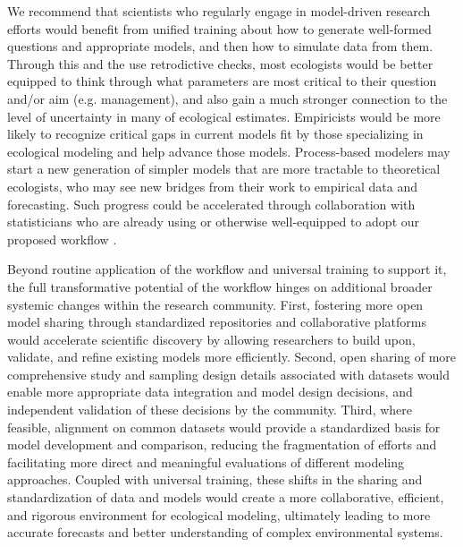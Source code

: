\documentclass[11pt]{article}
\newcommand{\llabel}[1]{\hypertarget{lintarget:#1}{}\linelabel{lin:#1}}
\begin{document}
We recommend that scientists who regularly engage in model-driven research efforts would benefit from unified training about how to generate well-formed questions and appropriate models, and then how to simulate data from them. Through this and the use retrodictive checks, most ecologists would be better equipped to think through what parameters are most critical to their question and/or aim (e.g. management), and also gain a much stronger connection to the level of uncertainty in many of ecological estimates. Empiricists would be more likely to recognize critical gaps in current models fit by those specializing in ecological modeling and help advance those models. Process-based modelers may start a new generation of simpler models that are more tractable to theoretical ecologists, who may see new bridges from their work to empirical data and forecasting. \llabel{collab}Such progress could be accelerated through collaboration with statisticians who are already using or otherwise well-equipped to adopt our proposed workflow \citep{betanworkflow,Gelman2020, grinsztajn2021,vandeschoot2021}. %

\llabel{studydesignandmore}Beyond routine application of the workflow and universal training to support it, the full transformative potential of the workflow hinges on additional broader systemic changes within the research community. First, fostering more open model sharing through standardized repositories and collaborative platforms would accelerate scientific discovery by allowing researchers to build upon, validate, and refine existing models more efficiently. Second, open sharing of more comprehensive study and sampling design details associated with datasets would enable more appropriate data integration and model design decisions, and independent validation of these decisions by the community. Third, where feasible, alignment on common datasets would provide a standardized basis for model development and comparison, reducing the fragmentation of efforts and facilitating more direct and meaningful evaluations of different modeling approaches. Coupled with universal training, these shifts in the sharing and standardization of data and models would create a more collaborative, efficient, and rigorous environment for ecological modeling, ultimately leading to more accurate forecasts and better understanding of complex environmental systems.
\end{document}

